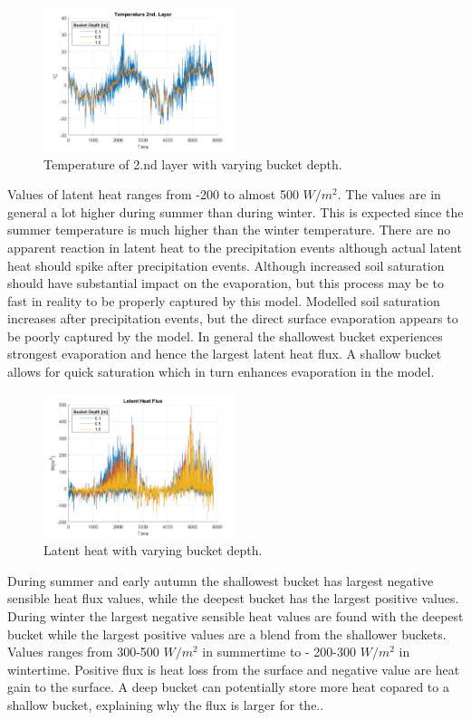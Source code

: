 \documentclass[a4paper,11pt,twocolumn]{article}
\begin{document}
\begin{figure}[h]
	\centering 
	\includegraphics[width=0.5\textwidth]{figures/t_ground}
	\caption{Temperature of 2.nd layer with varying bucket depth.}
	\label{fig:t2}
\end{figure} 


Values of latent heat ranges from -200 to almost 500 $W/m^2$. The values are in general a lot higher during summer than during winter. This is expected since the summer temperature is much higher than the winter temperature. There are no apparent reaction in latent heat to the precipitation events although actual latent heat should spike after precipitation events. Although increased soil saturation should have substantial impact on the evaporation, but this process may be to fast in reality to be properly captured by this model. Modelled soil saturation increases after precipitation events, but the direct surface evaporation appears to be poorly captured by the model. In general the shallowest bucket experiences strongest evaporation and hence the largest latent heat flux. A shallow bucket allows for quick saturation which in turn enhances evaporation in the model.

\begin{figure}[h]
	\centering 
	\includegraphics[width=0.5\textwidth]{figures/latent_heat}
	\caption{Latent heat with varying bucket depth.}
	\label{fig:latent}
\end{figure} 

During summer and early autumn the shallowest bucket has largest negative sensible heat flux values, while the deepest bucket has the largest positive values. During winter the largest negative sensible heat values are found with the deepest bucket while the largest positive values are a blend from the shallower buckets. Values ranges from 300-500 $W/m^{2}$ in summertime to - 200-300 $W/m^{2}$ in wintertime. Positive flux is heat loss from the surface and negative value are heat gain to the surface. A deep bucket can potentially store more heat copared to a shallow bucket, explaining why the flux is larger for the..
\end{document}
